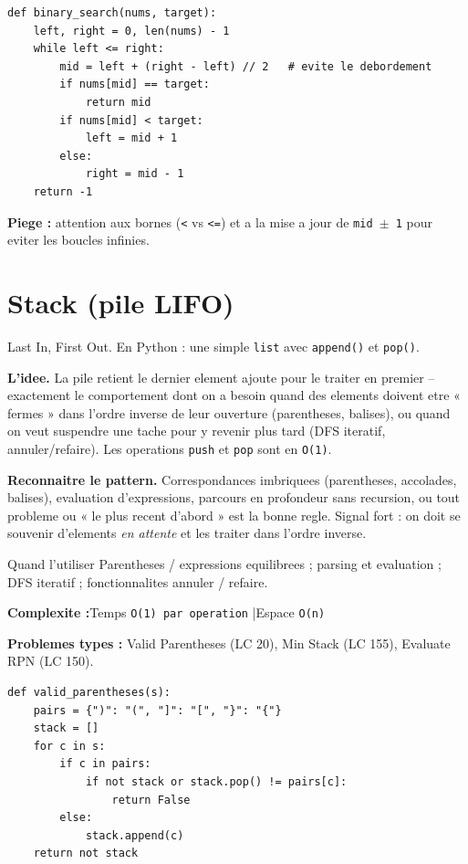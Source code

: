 \documentclass[11pt,a4paper]{article}
\newcommand{\complexite}[2]{%
  \noindent\textbf{Complexite :}\quad Temps \texttt{#1} \quad|\quad Espace \texttt{#2}\par\smallskip}
\newcommand{\leetcode}[1]{\noindent\textbf{Problemes types :} #1\par\medskip}
\begin{document}
\begin{lstlisting}
def binary_search(nums, target):
    left, right = 0, len(nums) - 1
    while left <= right:
        mid = left + (right - left) // 2   # evite le debordement
        if nums[mid] == target:
            return mid
        if nums[mid] < target:
            left = mid + 1
        else:
            right = mid - 1
    return -1
\end{lstlisting}

\textbf{Piege :} attention aux bornes (\texttt{<} vs \texttt{<=}) et a la mise a
jour de \texttt{mid $\pm$ 1} pour eviter les boucles infinies.

\section{Stack (pile LIFO)}
Last In, First Out. En Python : une simple \texttt{list} avec \texttt{append()}
et \texttt{pop()}.

\textbf{L'idee.} La pile retient le dernier element ajoute pour le traiter en
premier -- exactement le comportement dont on a besoin quand des elements doivent
etre « fermes » dans l'ordre inverse de leur ouverture (parentheses, balises),
ou quand on veut suspendre une tache pour y revenir plus tard (DFS iteratif,
annuler/refaire). Les operations \texttt{push} et \texttt{pop} sont en
\texttt{O(1)}.

\textbf{Reconnaitre le pattern.} Correspondances imbriquees (parentheses,
accolades, balises), evaluation d'expressions, parcours en profondeur sans
recursion, ou tout probleme ou « le plus recent d'abord » est la bonne regle.
Signal fort : on doit se souvenir d'elements \emph{en attente} et les traiter dans
l'ordre inverse.

\begin{infobox}{Quand l'utiliser}
Parentheses / expressions equilibrees ; parsing et evaluation ; DFS iteratif ;
fonctionnalites annuler / refaire.
\end{infobox}

\complexite{O(1) par operation}{O(n)}
\leetcode{Valid Parentheses (LC 20), Min Stack (LC 155), Evaluate RPN (LC 150).}

\begin{lstlisting}
def valid_parentheses(s):
    pairs = {")": "(", "]": "[", "}": "{"}
    stack = []
    for c in s:
        if c in pairs:
            if not stack or stack.pop() != pairs[c]:
                return False
        else:
            stack.append(c)
    return not stack
\end{lstlisting}
\end{document}
